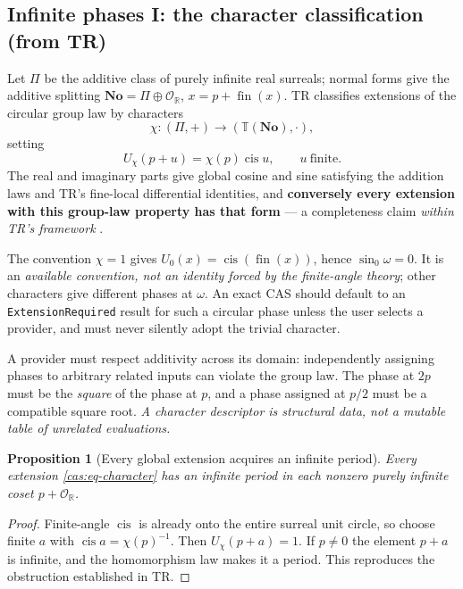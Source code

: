 \documentclass[11pt,letterpaper]{article}
\numberwithin{equation}{section}
\newtheorem{proposition}[theorem]{Proposition}
\theoremstyle{definition}
\theoremstyle{remark}
\newcommand{\No}{\mathbf{No}}
\newcommand{\R}{\mathbb R}
\newcommand{\OO}{\mathcal O}
\newcommand{\fin}{\operatorname{fin}}
\newcommand{\cis}{\operatorname{cis}}
\begin{document}
\subsection{Infinite phases I: the character classification (from TR)}
\label{cas:sub-characters}
Let $\Pi$ be the additive class of purely infinite real surreals; normal forms
give the additive splitting $\No=\Pi\oplus\OO_\R$, $x=p+\fin(x)$. TR classifies
extensions of the circular group law by characters
\[
 \chi:(\Pi,+)\longrightarrow(\mathbb T(\No),\cdot),
\]
setting
\begin{equation}\label{cas:eq-character}
 U_\chi(p+u)=\chi(p)\cis u,\qquad u\ \text{finite}.
\end{equation}
The real and imaginary parts give global cosine and sine satisfying the addition
laws and TR's fine-local differential identities, and \textbf{conversely every
extension with this group-law property has that form} --- a completeness claim
\emph{within TR's framework} \cite{cas:SourceTrig}.

The convention $\chi=1$ gives $U_0(x)=\cis(\fin(x))$, hence $\sin_0\omega=0$. It
is an \emph{available convention, not an identity forced by the finite-angle
theory}; other characters give different phases at $\omega$. An exact CAS should
default to an \texttt{ExtensionRequired} result for such a circular phase unless
the user selects a provider, and must never silently adopt the trivial
character.

A provider must respect additivity across its domain: independently assigning
phases to arbitrary related inputs can violate the group law. The phase at $2p$
must be the \emph{square} of the phase at $p$, and a phase assigned at $p/2$
must be a compatible square root. \emph{A character descriptor is structural
data, not a mutable table of unrelated evaluations.}

\begin{proposition}[Every global extension acquires an infinite period]
\label{cas:prop-periods}
Every extension \eqref{cas:eq-character} has an infinite period in each nonzero
purely infinite coset $p+\OO_\R$.
\end{proposition}
\begin{proof}
Finite-angle $\cis$ is already onto the entire surreal unit circle, so choose
finite $a$ with $\cis a=\chi(p)^{-1}$. Then $U_\chi(p+a)=1$. If $p\ne0$ the
element $p+a$ is infinite, and the homomorphism law makes it a period. This
reproduces the obstruction established in TR.
\end{proof}
\end{document}
